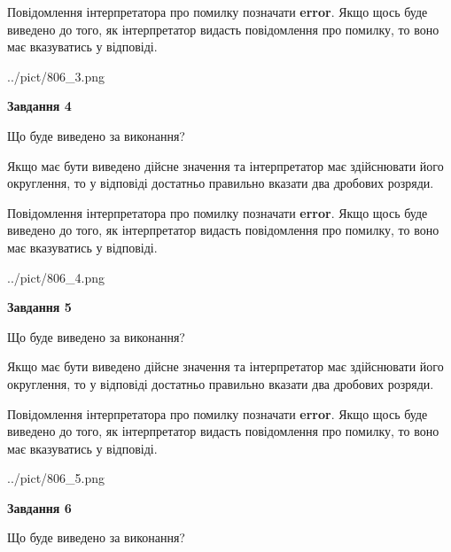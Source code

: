 \documentclass[12pt, ukrainian]{article}
\begin{document}
{\begin {Large}
Повідомлення інтерпретатора про помилку позначати \textbf{error}.
Якщо щось буде виведено до того, як інтерпретатор видасть повідомлення про помилку, 
то воно має вказуватись у відповіді. \par

\begin{center}
	{../pict/806_3.png}
\end{center}
\newpage

{\begin {center}\textbf{Завдання 4}\end {center}}\par
Що буде виведено за виконання? \par

Якщо має бути виведено дійсне значення та інтерпретатор має здійснювати його округлення, 
то у відповіді достатньо правильно вказати два дробових розряди.

Повідомлення інтерпретатора про помилку позначати \textbf{error}.
Якщо щось буде виведено до того, як інтерпретатор видасть повідомлення про помилку, 
то воно має вказуватись у відповіді. \par

\begin{center}
	{../pict/806_4.png}
\end{center}
\newpage

{\begin {center}\textbf{Завдання 5}\end {center}}\par
Що буде виведено за виконання? \par

Якщо має бути виведено дійсне значення та інтерпретатор має здійснювати його округлення, 
то у відповіді достатньо правильно вказати два дробових розряди.

Повідомлення інтерпретатора про помилку позначати \textbf{error}.
Якщо щось буде виведено до того, як інтерпретатор видасть повідомлення про помилку, 
то воно має вказуватись у відповіді. \par

\begin{center}
	{../pict/806_5.png}
\end{center}
\newpage

{\begin {center}\textbf{Завдання 6}\end {center}}\par
Що буде виведено за виконання? \par


\end{Large}}
\end{document}
